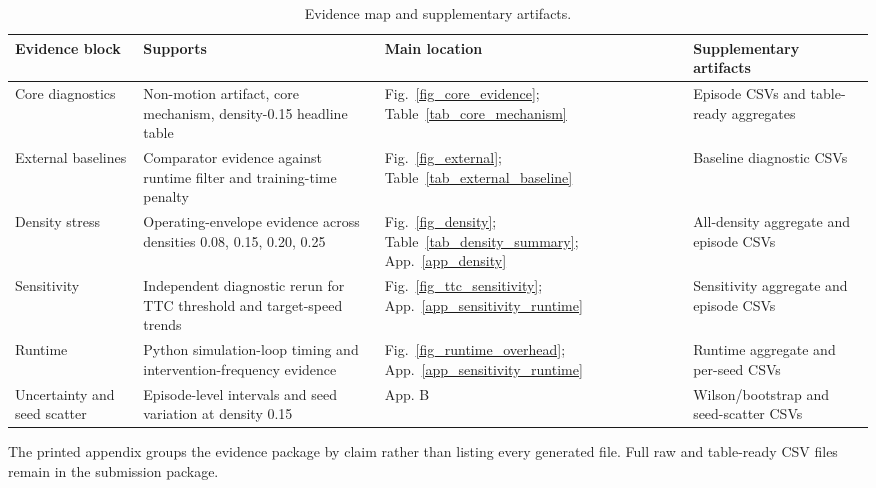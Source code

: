 \begin{table}[!htbp]
\centering
\caption{Evidence map and supplementary artifacts.}
\label{tab_data_manifest}
\footnotesize
\setlength{\tabcolsep}{3.0pt}
\renewcommand{\arraystretch}{1.08}
\begin{tabular}{@{}>{\raggedright\arraybackslash}p{}>{\raggedright\arraybackslash}p{}>{\raggedright\arraybackslash}p{}>{\raggedright\arraybackslash}p{}@{}}
\toprule
Evidence block & Supports & Main location & Supplementary artifacts \\
\midrule
Core diagnostics & Non-motion artifact, core mechanism, density-0.15 headline table & Fig.~\ref{fig_core_evidence}; Table~\ref{tab_core_mechanism} & Episode CSVs and table-ready aggregates \\
External baselines & Comparator evidence against runtime filter and training-time penalty & Fig.~\ref{fig_external}; Table~\ref{tab_external_baseline} & Baseline diagnostic CSVs \\
Density stress & Operating-envelope evidence across densities 0.08, 0.15, 0.20, 0.25 & Fig.~\ref{fig_density}; Table~\ref{tab_density_summary}; App.~\ref{app_density} & All-density aggregate and episode CSVs \\
Sensitivity & Independent diagnostic rerun for TTC threshold and target-speed trends & Fig.~\ref{fig_ttc_sensitivity}; App.~\ref{app_sensitivity_runtime} & Sensitivity aggregate and episode CSVs \\
Runtime & Python simulation-loop timing and intervention-frequency evidence & Fig.~\ref{fig_runtime_overhead}; App.~\ref{app_sensitivity_runtime} & Runtime aggregate and per-seed CSVs \\
Uncertainty and seed scatter & Episode-level intervals and seed variation at density 0.15 & App. B & Wilson/bootstrap and seed-scatter CSVs \\
\bottomrule
\end{tabular}
\begin{tablenotes}
\item The printed appendix groups the evidence package by claim rather than listing every generated file. Full raw and table-ready CSV files remain in the submission package.
\end{tablenotes}
\end{table}
